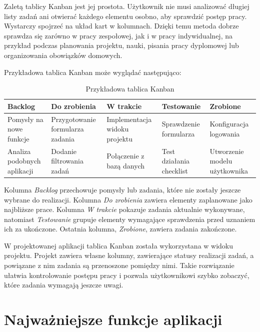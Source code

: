 \documentclass[12pt,a4paper,twoside]{report}
\begin{document}
Zaletą tablicy Kanban jest jej prostota. Użytkownik nie musi analizować długiej listy zadań ani otwierać każdego elementu osobno, aby sprawdzić postęp pracy. Wystarczy spojrzeć na układ kart w kolumnach. Dzięki temu metoda dobrze sprawdza się zarówno w pracy zespołowej, jak i w pracy indywidualnej, na przykład podczas planowania projektu, nauki, pisania pracy dyplomowej lub organizowania obowiązków domowych.

Przykładowa tablica Kanban może wyglądać następująco:

\begin{table}[H]
  \centering
  \caption{Przykładowa tablica Kanban}
  \begin{tabular}{|>{\raggedright\arraybackslash}p{2.55cm}|>{\raggedright\arraybackslash}p{2.55cm}|>{\raggedright\arraybackslash}p{2.55cm}|>{\raggedright\arraybackslash}p{2.55cm}|>{\raggedright\arraybackslash}p{2.55cm}|}
    \hline
    \textbf{Backlog} & \textbf{Do zrobienia} & \textbf{W trakcie} & \textbf{Testowanie} & \textbf{Zrobione} \\
    \hline
    Pomysły na nowe funkcje & Przygotowanie formularza zadania & Implementacja widoku projektu & Sprawdzenie formularza & Konfiguracja logowania \\
    \hline
    Analiza podobnych aplikacji & Dodanie filtrowania zadań & Połączenie z bazą danych & Test działania checklist & Utworzenie modelu użytkownika \\
    \hline
  \end{tabular}
\end{table}

Kolumna \textit{Backlog} przechowuje pomysły lub zadania, które nie zostały jeszcze wybrane do realizacji. Kolumna \textit{Do zrobienia} zawiera elementy zaplanowane jako najbliższe prace. Kolumna \textit{W trakcie} pokazuje zadania aktualnie wykonywane, natomiast \textit{Testowanie} grupuje elementy wymagające sprawdzenia przed uznaniem ich za ukończone. Ostatnia kolumna, \textit{Zrobione}, zawiera zadania zakończone.

W projektowanej aplikacji tablica Kanban została wykorzystana w widoku projektu. Projekt zawiera własne kolumny, zawierające statusy realizacji zadań, a powiązane z nim zadania są przenoszone pomiędzy nimi. Takie rozwiązanie ułatwia kontrolowanie postępu pracy i pozwala użytkownikowi szybko zobaczyć, które zadania wymagają jeszcze uwagi.

\section{Najważniejsze funkcje aplikacji}
\end{document}
